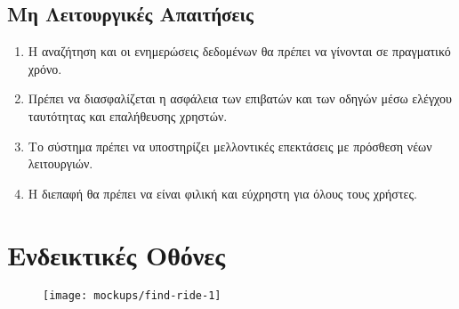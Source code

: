 \subsection{Μη Λειτουργικές Απαιτήσεις}

\begin{enumerate}
    \item Η αναζήτηση και οι ενημερώσεις δεδομένων θα πρέπει να γίνονται σε πραγματικό χρόνο.
    \item Πρέπει να διασφαλίζεται η ασφάλεια των επιβατών και των οδηγών μέσω ελέγχου ταυτότητας
          και επαλήθευσης χρηστών.
    \item Το σύστημα πρέπει να υποστηρίζει μελλοντικές επεκτάσεις με πρόσθεση νέων λειτουργιών.
    \item Η διεπαφή θα πρέπει να είναι φιλική και εύχρηστη για όλους τους χρήστες.
\end{enumerate}

\newpage

\section{Ενδεικτικές Οθόνες}

\begin{figure}
    \centering
    \texttt{[image: mockups/find-ride-1]}
\end{figure}


